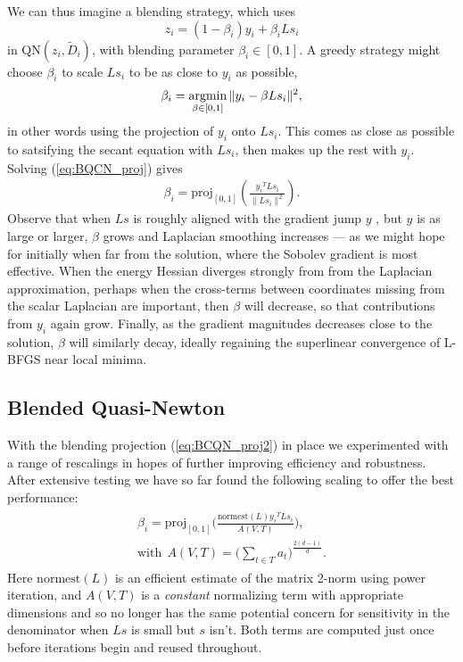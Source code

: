 We can thus imagine a blending strategy, which uses
\begin{equation}
z_i=(1-\beta_i)y_i + \beta_i Ls_i
\end{equation}
in $\mathrm{QN}(z_i, \tilde{D}_i)$, with blending parameter $\beta_i \in [0,1]$.
A greedy strategy might choose $\beta_i$ to scale $Ls_i$ to be as close to $y_i$ as possible,
\begin{equation}
\label{eq:BQCN_proj}
\beta_i = \mathop{\rm argmin}_{\beta\in[0,1]} \| y_i - \beta L s_i \|^2,
\end{equation}
in other words using the projection of $y_i$ onto $Ls_i$. This comes as close as possible to
satsifying the secant equation with $Ls_i$, then makes up the rest with $y_i$. 
Solving (\ref{eq:BQCN_proj}) gives 
\begin{align}
\label{eq:BCQN_proj2}
\beta_i = \mathrm{proj}_{[0,1]} \left( \frac{{y_i}^T L s_i}{ \|L s_i\|^2 } \right).
\end{align}
Observe that when $Ls$ is roughly aligned with the gradient jump $y$ , but $y$ is as large or larger, $\beta$ grows and Laplacian smoothing increases --- as we might
hope for initially when far from the solution, where the Sobolev gradient is most effective.
When the energy Hessian diverges strongly from from the Laplacian
approximation, perhaps when the cross-terms between coordinates missing from the scalar Laplacian
are important, then $\beta$ will decrease, so that contributions from $y_i$ again grow.
Finally, as the gradient magnitudes decreases close to the solution,
$\beta$ will similarly decay, ideally regaining the
superlinear convergence of L-BFGS near local minima.


\subsection{Blended Quasi-Newton}

With the blending projection (\ref{eq:BCQN_proj2}) in place we experimented with a range of rescalings in hopes of 
further improving efficiency and robustness. After extensive testing we have so far found the following scaling
to offer the best performance:
\begin{align}
\begin{split}
\beta_i =  \mathrm{proj}_{[0,1]} \Big(\frac{ \mathrm{normest}(L) {y_i}^T L s_i}{A(V,T)} \Big), \\
\text{with} \> \> A(V,T) = \Big(\sum_{t \in T} a_t \Big)^{\frac{2 (d - 1)}{d}}.
\end{split}
\end{align}
Here $\mathrm{normest}(L)$ is an efficient estimate of the matrix 2-norm using power iteration,
and $A(V,T)$ is a \emph{constant} normalizing term with appropriate dimensions and so no longer
has the same potential concern for sensitivity in the denominator when $Ls$ is small but $s$ isn't. Both terms are computed just
once before iterations begin and reused throughout. 

